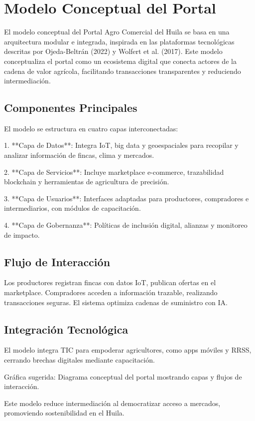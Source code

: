 \section{Modelo Conceptual del Portal}

El modelo conceptual del Portal Agro Comercial del Huila se basa en una arquitectura modular e integrada, inspirada en las plataformas tecnológicas descritas por Ojeda-Beltrán (2022) y Wolfert et al. (2017). Este modelo conceptualiza el portal como un ecosistema digital que conecta actores de la cadena de valor agrícola, facilitando transacciones transparentes y reduciendo intermediación.

\subsection{Componentes Principales}

El modelo se estructura en cuatro capas interconectadas:

1. **Capa de Datos**: Integra IoT, big data y geoespaciales para recopilar y analizar información de fincas, clima y mercados.

2. **Capa de Servicios**: Incluye marketplace e-commerce, trazabilidad blockchain y herramientas de agricultura de precisión.

3. **Capa de Usuarios**: Interfaces adaptadas para productores, compradores e intermediarios, con módulos de capacitación.

4. **Capa de Gobernanza**: Políticas de inclusión digital, alianzas y monitoreo de impacto.

\subsection{Flujo de Interacción}

Los productores registran fincas con datos IoT, publican ofertas en el marketplace. Compradores acceden a información trazable, realizando transacciones seguras. El sistema optimiza cadenas de suministro con IA.

\subsection{Integración Tecnológica}

El modelo integra TIC para empoderar agricultores, como apps móviles y RRSS, cerrando brechas digitales mediante capacitación.

Gráfica sugerida: Diagrama conceptual del portal mostrando capas y flujos de interacción.

Este modelo reduce intermediación al democratizar acceso a mercados, promoviendo sostenibilidad en el Huila.